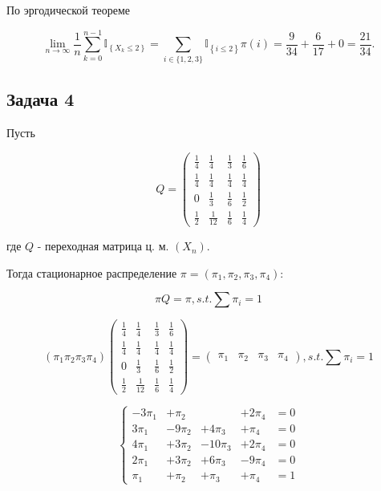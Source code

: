 \documentclass[a4paper,12pt]{article} %
\begin{document}
По эргодической теореме 

$$ 
\lim_{n \to \infty }\frac{1}{n} \sum_{k=0}^{n-1} \mathbb{I}_{\left\{X_{k} \leq 2\right\}} =  \sum_{i\in {\{1,2,3\} } } \mathbb{I}_{\left\{i \leq 2\right\}} \pi(i)  =   \dfrac{9}{34} + \dfrac{6}{17} + 0 =  \dfrac{21}{34}. $$

\subsection*{Задача 4}
  

Пусть

$$Q=\left(\begin{array}{cccc}
\frac{1}{4} & \frac{1}{4} & \frac{1}{3} & \frac{1}{6} \\
\frac{1}{4} & \frac{1}{4} & \frac{1}{4} & \frac{1}{4} \\
0 & \frac{1}{3} & \frac{1}{6} & \frac{1}{2} \\
\frac{1}{2} & \frac{1}{12} & \frac{1}{6} & \frac{1}{4}
\end{array}\right)$$

где $Q$ - переходная матрица ц. м.  $(X_n)$. 


Тогда стационарное распределение $\pi=\left(\pi_{1}, \pi_{2}, \pi_{3}, \pi_{4} \right)$:

$$\pi Q=\pi, s.t. \sum \pi_i = 1 $$


$$\left(\pi_{1} \pi_{2} \pi_{3} \pi_{4}\right)\left(\begin{array}{cccc}
\frac{1}{4} & \frac{1}{4} & \frac{1}{3} & \frac{1}{6} \\
\frac{1}{4} & \frac{1}{4} & \frac{1}{4} & \frac{1}{4} \\
0 & \frac{1}{3} & \frac{1}{6} & \frac{1}{2} \\
\frac{1}{2} & \frac{1}{12} & \frac{1}{6} & \frac{1}{4}
\end{array}\right)=\left(\begin{array}{llll}
\pi_{1} & \pi_{2} & \pi_{3} & \pi_{4}
\end{array}\right), s.t. \sum \pi_i = 1  $$

$$\left\{\begin{array}{ccccc}
-3\pi_{1} &+ \pi_{2}&&+ 2 \pi_{4} &=0 \\
3 \pi_{1} &-9 \pi_{2}&+4 \pi_{3}&+\pi_{4}&=0 \\
4 \pi_{1} &+3 \pi_{2}&-10 \pi_{3}&+2 \pi_{4}&=0 \\
2 \pi_{1} &+3 \pi_{2}&+6 \pi_{3}&-9 \pi_{4}&=0 \\
\pi_{1}&+\pi_{2}&+\pi_{3}&+\pi_{4}&=1
\end{array}\right.$$
\end{document}
